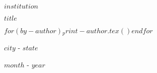 \thispagestyle{empty}

\begin{center}
$institution$
\end{center}


\vspace{4cm}

\begin{center}
    \textbf{$title$}
\end{center}

\vspace{4cm}
\hypersetup{
    urlcolor=black,
    linkcolor=black
}

\begin{center}
$for(by-author)$$_print-author.tex()$$endfor$
\end{center}


\vspace{7cm}

\begin{center}

$city$ - $state$

$month$ - $year$
    
\end{center}

\newpage

\renewcommand{\listfigurename}{LISTA DE FIGURAS}
\pagestyle{fancy}
\listoffigures


\newpage
\renewcommand{\contentsname}{SUMÁRIO}
\pagestyle{fancy}
\tableofcontents

\newpage
{}
